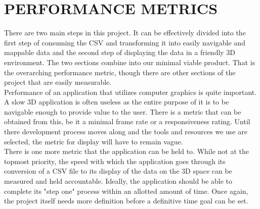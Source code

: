 \documentclass[journal,10pt,onecolumn,compsoc]{IEEEtran}
\begin{document}
\section {PERFORMANCE METRICS}
There are two main steps in this project. It can be effectively divided into the first step of consuming the CSV and transforming it into easily navigable and mappable data and the second step of displaying the data in a friendly 3D environment. The two sections combine into our minimal viable product. That is the overarching performance metric, though there are other sections of the project that are easily measurable. \\
Performance of an application that utilizes computer graphics is quite important. A slow 3D application is often useless as the entire purpose of it is to be navigable enough to provide value to the user. There is a metric that can be obtained from this, be it a minimal frame rate or a responsiveness rating. Until there development process moves along and the tools and resources we use are selected, the metric for display will have to remain vague. \\
There is one more metric that the application can be held to. While not at the topmost priority, the speed with which the application goes through its conversion of a CSV file to its display of the data on the 3D space can be measured and held accountable. Ideally, the application should be able to complete its "step one" process within an allotted amount of time. Once again, the project itself needs more definition before a definitive time goal can be set.
   
\end{document}
